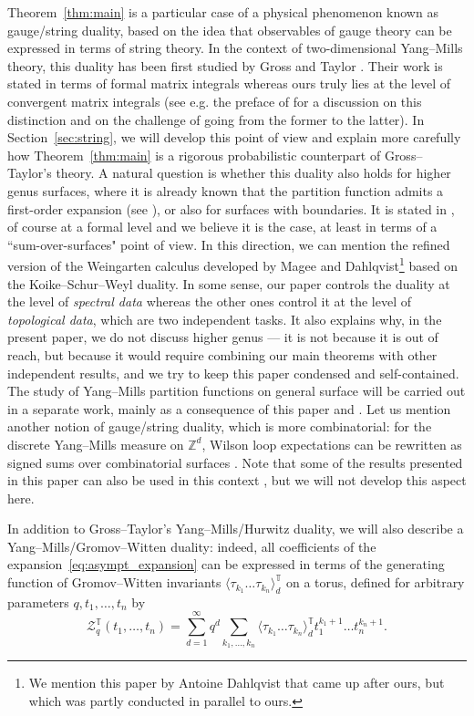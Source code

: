 \documentclass[11pt,a4paper,reqno]{article}
\theoremstyle{definition}
\theoremstyle{remark}
\newcommand\Z{{\mathbb Z}}
\newcommand\Tbb{\mathbb{T}}
\begin{document}
Theorem~\ref{thm:main} is a particular case of a physical phenomenon known as gauge/string duality, based on the idea that observables of gauge theory can be expressed in terms of string theory. In the context of two-dimensional Yang--Mills theory, this duality has been first studied by Gross and Taylor \cite{Gro,GT,GT2}. Their work is stated in terms of formal matrix integrals whereas ours truly lies at the level of convergent matrix integrals (see e.g. the preface of \cite{Eyn} for a discussion on this distinction and on the challenge of going from the former to the latter). In Section~\ref{sec:string}, we will develop this point of view and explain more carefully how Theorem~\ref{thm:main} is a rigorous probabilistic counterpart of Gross--Taylor's theory. A natural question is whether this duality also holds for higher genus surfaces, where it is already known that the partition function admits a first-order expansion (see \cite{Lem,DL,Lem3}), or also for surfaces with boundaries. It is  stated  in \cite{GT,GT2}, of course at a formal level and we believe it is the case, at least in terms of a ``sum-over-surfaces" point of view. In this direction, we can mention the refined version of the Weingarten calculus developed by Magee \cite{Mag2} and Dahlqvist\footnote{We mention this paper by Antoine Dahlqvist that came up after ours, but which was partly conducted in parallel to ours.} \cite{Dah26} based on the Koike--Schur--Weyl duality. In some sense, our paper controls the duality at the level of \emph{spectral data} whereas the other ones control it at the level of \emph{topological data}, which are two independent tasks. It also explains why, in the present paper, we do not discuss higher genus --- it is not because it is out of reach, but because it would require combining our main theorems with other independent results, and we try to keep this paper condensed and self-contained. The study of Yang--Mills partition functions on general surface will be carried out in a separate work, mainly as a consequence of this paper and \cite{Dah26}. Let us mention another notion of gauge/string duality, which is more combinatorial: for the discrete Yang--Mills measure on $\Z^d$, Wilson loop expectations can be rewritten as signed sums over combinatorial surfaces \cite{Jaf16,Cha19,CPS,BCSK,Lem26a}. Note that some of the results presented in this paper can also be used in this context \cite{Lem26mf}, but we will not develop this aspect here.

In addition to Gross--Taylor's Yang--Mills/Hurwitz duality, we will also describe a Yang--Mills/Gromov--Witten duality: indeed, all coefficients of the expansion~\eqref{eq:asympt_expansion} can be expressed in terms of the generating function of Gromov--Witten invariants $\langle \tau_{k_1}\ldots\tau_{k_n}\rangle_d^\Tbb$ on a torus, defined for arbitrary parameters $q,t_1,\ldots,t_n$ by
\[
\mathcal{Z}_q^\Tbb(t_1,\ldots,t_n)=\sum_{d=1}^\infty q^d\sum_{k_1,\ldots,k_n}\langle\tau_{k_1}\ldots\tau_{k_n}\rangle_d^\Tbb t_1^{k_1+1}\ldots t_n^{k_n+1}.
\]
\end{document}
